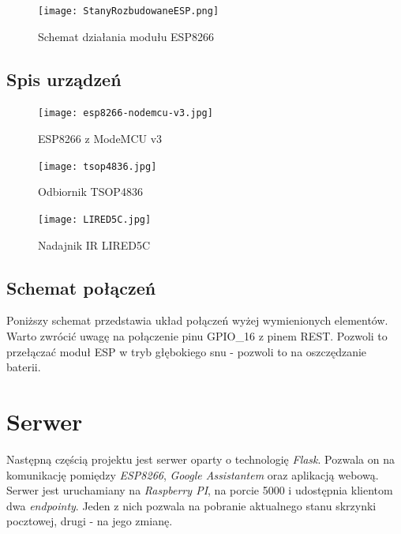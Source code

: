 \begin{figure}[H]
	\centering
	\texttt{[image: StanyRozbudowaneESP.png]}
	\caption{Schemat działania modułu ESP8266}
\end{figure}

\subsection{Spis urządzeń}



	\begin{figure}[H]
	\centering
	\texttt{[image: esp8266-nodemcu-v3.jpg]}
	\caption{ESP8266 z ModeMCU v3}
	\end{figure}
	
	\begin{figure}[H]
	\centering
	\texttt{[image: tsop4836.jpg]}
	\caption{Odbiornik TSOP4836 }
	\end{figure}
	
	
	\begin{figure}[H]
	\centering
	\texttt{[image: LIRED5C.jpg]}
	\caption{Nadajnik IR LIRED5C}
	\end{figure}

\subsection{Schemat połączeń}

Poniższy schemat przedstawia układ połączeń wyżej wymienionych elementów. Warto zwrócić uwagę na połączenie pinu GPIO\_16 z pinem REST. Pozwoli to przełączać moduł ESP w tryb głębokiego snu - pozwoli to na oszczędzanie baterii.

\begin{center}
\end{center}

\section{Serwer}

Następną częścią projektu jest serwer oparty o technologię \textit{Flask}. Pozwala on na komunikację pomiędzy \textit{ESP8266}, \textit{Google Assistantem} oraz aplikacją webową.\\

Serwer jest uruchamiany na \textit{Raspberry PI}, na porcie 5000 i udostępnia klientom dwa \textit{endpointy}. Jeden z nich pozwala na pobranie aktualnego stanu skrzynki pocztowej, drugi - na jego zmianę. \\

